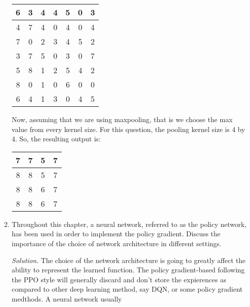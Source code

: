 \documentclass[12pt]{article}
\newcommand\sol[1] {
    \begin{mdframed}
        \emph{Solution.} #1
    \end{mdframed}
}
\begin{document}
\begin{enumerate}[ref=\theenumi]
{\begin{center}
\begin{tabular}{ | c | c | c | c | c | c | c | }
                    \hline
                    6 & 3 & 4 & 4 & 5 & 0 & 3 \\
                    \hline
                    4 & 7 & 4 & 0 & 4 & 0 & 4 \\
                    \hline
                    7 & 0 & 2 & 3 & 4 & 5 & 2 \\
                    \hline
                    3 & 7 & 5 & 0 & 3 & 0 & 7 \\
                    \hline
                    5 & 8 & 1 & 2 & 5 & 4 & 2 \\
                    \hline
                    8 & 0 & 1 & 0 & 6 & 0 & 0 \\
                    \hline
                    6 & 4 & 1 & 3 & 0 & 4 & 5 \\
                    \hline
                \end{tabular}
            \end{center}
            Now, assuming that we are using maxpooling, that is we 
            choose the max value from every kernel size. For this 
            question, the pooling kernel size is 4 by 4. So, the 
            resulting output is:
            \begin{center}
                \begin{tabular}{ | c | c | c | c | }
                    \hline
                    7  & 7  & 5  & 7 \\
                    \hline
                    8  & 8  & 5  & 7  \\
                    \hline
                    8  & 8  & 6  & 7 \\
                    \hline
                    8  & 8  & 6  & 7  \\
                    \hline
                \end{tabular}
            \end{center}
        }
    \item Throughout this chapter, a neural network, referred to as the policy network, has been
            used in order to implement the policy gradient. Discuss the importance of the choice
            of network architecture in different settings.
        \sol {
            The choice of the network architecture is going to greatly affect the ability to 
            represent the learned function. The policy gradient-based following the PPO style
            will generally discard and don't store the expierences as compared to other deep
            learning method, say DQN, or some policy gradient medthods. A neural network usually 
}
\end{enumerate}
\end{document}
